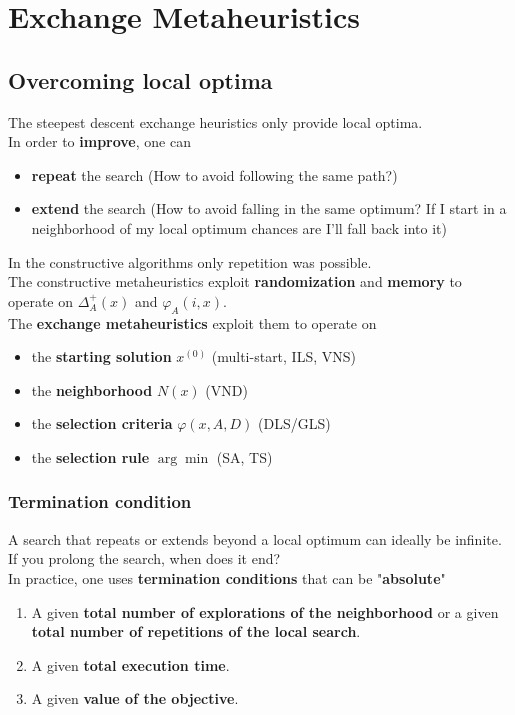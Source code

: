 \section{Exchange Metaheuristics}
\subsection{Overcoming local optima}
The steepest descent exchange heuristics only provide local optima.\\

In order to \textbf{improve}, one can
\begin{itemize}
	\item \textbf{repeat} the search (How to avoid following the same path?)
	\item \textbf{extend} the search (How to avoid falling in the same optimum? If I start in a neighborhood of my local optimum chances are I'll fall back into it)
\end{itemize}

In the constructive algorithms only repetition was possible.\\

The constructive metaheuristics exploit \textbf{randomization} and \textbf{memory} to operate on $\Delta_A^+ (x)$ and $\varphi_A (i, x)$.\\

The \textbf{exchange metaheuristics} exploit them to operate on
\begin{itemize}
	\item the \textbf{starting solution} $x^{(0)}$ (multi-start, ILS, VNS)
	\item the \textbf{neighborhood} $N (x)$ (VND)
	\item the \textbf{selection criteria} $\varphi (x, A, D)$ (DLS/GLS)
	\item the \textbf{selection rule} $\arg \min$ (SA, TS)
\end{itemize}

\newpage

\subsubsection{Termination condition} 

A search that repeats or extends beyond a local optimum can ideally be infinite. If you prolong the search, when does it end? \\

In practice, one uses \textbf{termination conditions} that can be "\textbf{absolute}"
\begin{enumerate}
	\item A given \textbf{total number of explorations of the neighborhood} or a given \textbf{total number of repetitions of the local search}.\\
	
	\item A given \textbf{total execution time}.\\
	
	\item A given \textbf{value of the objective}.\\
\end{enumerate}

